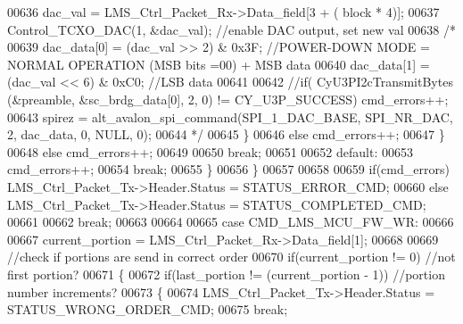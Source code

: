 \begin{DoxyCode}
00636                                         dac_val = LMS\_Ctrl\_Packet\_Rx->Data_field[3 + (
      block * 4)];
00637                                         Control_TCXO_DAC(1, &dac_val); \textcolor{comment}{//enable DAC output, set new val}
00638 \textcolor{comment}{/*}
00639 \textcolor{comment}{                                        dac\_data[0] = (dac\_val >> 2) & 0x3F; //POWER-DOWN MODE = NORMAL
       OPERATION (MSB bits =00) + MSB data}
00640 \textcolor{comment}{                                        dac\_data[1] = (dac\_val << 6) & 0xC0; //LSB data}
00641 \textcolor{comment}{}
00642 \textcolor{comment}{                                        //if( CyU3PI2cTransmitBytes (&preamble, &sc\_brdg\_data[0], 2, 0) !=
       CY\_U3P\_SUCCESS)  cmd\_errors++;}
00643 \textcolor{comment}{                                        spirez = alt\_avalon\_spi\_command(SPI\_1\_DAC\_BASE, SPI\_NR\_DAC, 2,
       dac\_data, 0, NULL, 0);}
00644 \textcolor{comment}{*/}
00645                                     \}
00646                                     \textcolor{keywordflow}{else} cmd_errors++;
00647                                 \}
00648                                 \textcolor{keywordflow}{else} cmd_errors++;
00649 
00650                             \textcolor{keywordflow}{break};
00651 
00652                             \textcolor{keywordflow}{default}:
00653                                 cmd_errors++;
00654                             \textcolor{keywordflow}{break};
00655                         \}
00656                     \}
00657 
00658 
00659                     \textcolor{keywordflow}{if}(cmd_errors) LMS\_Ctrl\_Packet\_Tx->Header.Status = 
      STATUS_ERROR_CMD;
00660                     \textcolor{keywordflow}{else} LMS\_Ctrl\_Packet\_Tx->Header.Status = 
      STATUS_COMPLETED_CMD;
00661 
00662                 \textcolor{keywordflow}{break};
00663 
00664 
00665                 \textcolor{keywordflow}{case} CMD_LMS_MCU_FW_WR:
00666 
00667                     current_portion = LMS\_Ctrl\_Packet\_Rx->Data_field[1];
00668 
00669                     \textcolor{comment}{//check if portions are send in correct order}
00670                     \textcolor{keywordflow}{if}(current_portion != 0) \textcolor{comment}{//not first portion?}
00671                     \{
00672                         \textcolor{keywordflow}{if}(last_portion != (current_portion - 1)) \textcolor{comment}{//portion number increments?}
00673                         \{
00674                             LMS\_Ctrl\_Packet\_Tx->Header.Status = 
      STATUS_WRONG_ORDER_CMD;
00675                             \textcolor{keywordflow}{break};

\end{DoxyCode}

